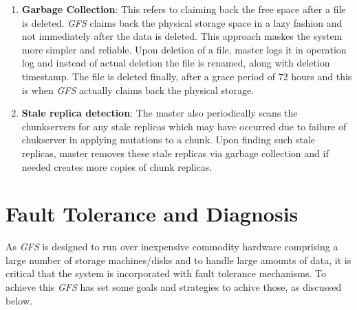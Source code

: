 \documentclass[12pt, a4paper]{article}
\begin{document}
\begin{enumerate}
        \item \textbf{Garbage Collection}: This refers to claiming back the free space after a file is deleted. \textit{GFS}\cite{Ghemawat:2003:GFS:945445.945450} claims back the physical storage space in a lazy fashion and not immediately after the data is deleted. This approach maskes the system more simpler and reliable. Upon deletion of a file, master logs it in operation log and instead of actual deletion the file is renamed, along with deletion timestamp. The file is deleted finally, after a grace period of 72 hours and this is when \textit{GFS}\cite{Ghemawat:2003:GFS:945445.945450} actually claims back the physical storage.

        \item \textbf{Stale replica detection}: The master also periodically scans the chunkservers for any stale replicas which may have occurred due to failure of chukserver in applying mutations to a chunk. Upon finding such stale replicas, master removes these stale replicas via garbage collection and if needed creates more copies of chunk replicas.

\end{enumerate}

\newpage

\section*{Fault Tolerance and Diagnosis}
As \textit{GFS}\cite{Ghemawat:2003:GFS:945445.945450} is designed to run over inexpensive commodity hardware comprising a large number of storage machines/disks and to handle large amounts of data, it is critical that the system is incorporated with fault tolerance mechanisms. To achieve this \textit{GFS}\cite{Ghemawat:2003:GFS:945445.945450} has set some goals and strategies to achive those, as discussed below.
\end{document}
